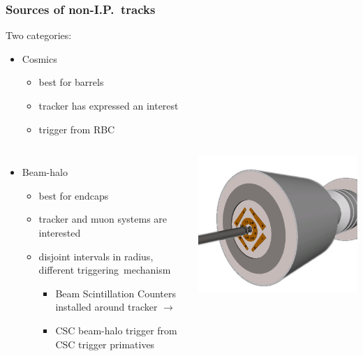 \documentclass[compress]{beamer}
\begin{document}
\begin{frame}
\frametitle{Sources of non-I.P.\ tracks}
Two categories:
\begin{itemize}
\item Cosmics
\begin{itemize}
\item best for barrels
\item tracker has expressed an interest
\item trigger from RBC
\end{itemize}
\end{itemize}

\begin{columns}
\begin{itemize}
\item Beam-halo
\begin{itemize}
\item best for endcaps
\item tracker and muon systems are interested
\item disjoint intervals in radius, different \mbox{triggering mechanism\hspace{-1 cm}}
\begin{itemize}
\item Beam Scintillation Counters installed around tracker \hfill $\longrightarrow$
\item CSC beam-halo trigger from CSC trigger primatives
\end{itemize}
\end{itemize}
\end{itemize}

\begin{center}
\includegraphics[width=\linewidth]{BSC_numbering-onshield.png}
\end{center}
\end{columns}

\end{frame}
\end{document}
